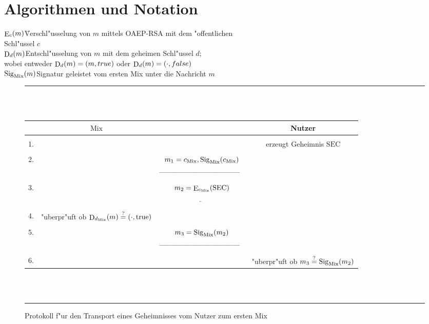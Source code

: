 \documentclass[a4paper,german]{article}
\def\sig{\mathop{\rm Sig}\nolimits}
\def\enc{\mathop{\rm E}\nolimits}
\def\dec{\mathop{\rm D}\nolimits}
\begin{document}
\section{Algorithmen und Notation}
\begin{tabbing}
$\enc_c(m)$\hspace{1cm}\=Verschl"usselung von $m$ mittels OAEP-RSA mit dem "offentlichen\\\>Schl"ussel $c$\\
$\dec_d(m)$\hspace{1cm}\>Entschl"usselung von $m$ mit dem geheimen Schl"ussel $d$;\\\>wobei
											entweder $\dec_d(m)=\left(m,true\right)$ oder $\dec_d(m)=\left(\cdot,false\right)$\\
$\sig_\text{Mix}(m)$\>Signatur geleistet vom ersten Mix unter die Nachricht $m$
\end{tabbing}

\begin{figure}
\noindent
\rule{13.3cm}{0.5mm}\\\\
\begin{tabular}
{l|ccc}
&$\text{Mix}$&&Nutzer\\
\hline\\
1.&&&\parbox{2.8cm}{erzeugt Geheimnis\\$\text{SEC}$}\\\\
2.&&$m_1=c_\text{Mix},\sig_\text{Mix}(c_\text{Mix})$\\
&&$\overrightarrow{\hspace{5cm}}$\\
\\
3.&&$m_2=\enc_{c_\text{Mix}}(\text{SEC})$\\
&&$\overleftarrow{\hspace{5cm}}$\\\\
4.&\parbox{3.1cm}{"uberpr"uft ob\\$\dec_{d_\text{Mix}}(m)\overset{?}{=}\left(\cdot,\text{true}\right)$}\\\\
5.&&$m_3=\sig_\text{Mix}(m_2)$\\
&&$\overrightarrow{\hspace{5cm}}$\\\\
6.&&&\parbox{3.1cm}{"uberpr"uft ob\\$m_3\overset{?}{=}\sig_\text{Mix}(m_2)$}
\end{tabular}\\\\
\rule{13.3cm}{0.5mm}
\caption{Protokoll f"ur den Transport eines Geheimnisses vom Nutzer zum ersten Mix}
\label{figKeyTransport}
\end{figure}
\end{document}
